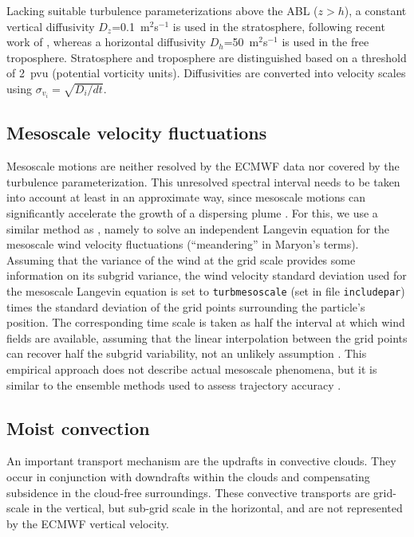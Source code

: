 \documentclass{egu}            %
\begin{document}
Lacking suitable turbulence parameterizations above the ABL ($z>h$), a constant
vertical diffusivity $D_z$=0.1~m$^2$s$^{-1}$ is used in the stratosphere,
following recent work of \citet{legras2003}, whereas a horizontal diffusivity
$D_h$=50~m$^2$s$^{-1}$ is used in the free troposphere.  Stratosphere and
troposphere are distinguished based on a threshold of 2~pvu (potential
vorticity units).  Diffusivities are converted into velocity scales using
$\sigma_{v_i}=\sqrt{D_i/dt}$.

\subsection{Mesoscale velocity fluctuations}

Mesoscale motions are neither resolved by the ECMWF data nor covered by the
turbulence parameterization.  This unresolved spectral interval needs to be
taken into account at least in an approximate way, since mesoscale motions can
significantly accelerate the growth of a dispersing plume \citep{gupta1997}.
For this, we use a similar method as \citet{maryon1998}, namely to solve an
independent Langevin equation for the mesoscale wind velocity fluctuations
(``meandering'' in Maryon's terms).  Assuming that the variance of the wind at
the grid scale provides some information on its subgrid variance, the wind
velocity standard deviation used for the mesoscale Langevin equation is set to
\verb|turbmesoscale| (set in file \verb|includepar|) times the standard
deviation of the grid points surrounding the particle's position.  The
corresponding time scale is taken as half the interval at which wind fields are
available, assuming that the linear interpolation between the grid points can
recover half the subgrid variability, not an unlikely assumption
\citep{stohl1995}.  This empirical approach does not describe actual mesoscale
phenomena, but it is similar to the ensemble methods used to assess trajectory
accuracy \citep{kahl1996, baumann1997, stohl1998}.

\subsection{Moist convection}

An important transport mechanism are the updrafts in convective clouds.  They
occur in conjunction with downdrafts within the clouds and compensating
subsidence in the cloud-free surroundings.  These convective transports are
grid-scale in the vertical, but sub-grid scale in the horizontal, and are not
represented by the ECMWF vertical velocity.
\end{document}
